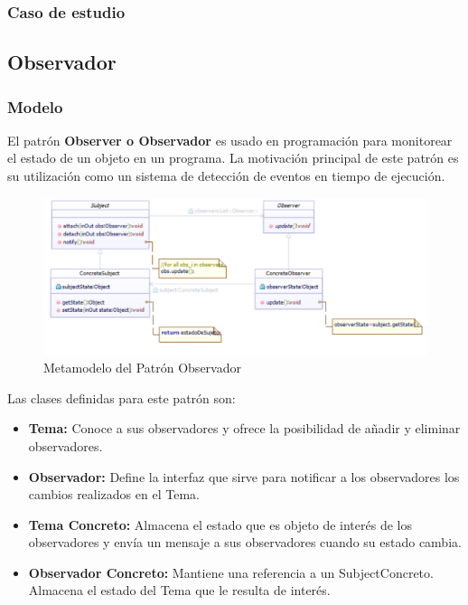 \subsubsection{Caso de estudio}
\newpage

\subsection{Observador}
\subsubsection{Modelo}

El patrón \textbf{Observer o Observador} es usado en programación para monitorear el estado de un objeto en un programa. La motivación principal de este patrón es su utilización como un sistema de detección de eventos en tiempo de ejecución.

\begin{figure}[th!]
	\centering
	\includegraphics[width=0.8\linewidth]{arquitectura/imagenes/modeloObservador}
	\caption{Metamodelo del Patrón Observador}
	\label{fig:metamodelo patron observador}
\end{figure}

Las clases definidas para este patrón son:

\begin{itemize}
	\item \textbf{Tema: }Conoce a sus observadores y ofrece la posibilidad de añadir y eliminar observadores.
	\item \textbf{Observador: }Define la interfaz que sirve para notificar a los observadores los cambios realizados en el Tema.
	\item \textbf{Tema Concreto: }Almacena el estado que es objeto de interés de los observadores y envía un mensaje a sus observadores cuando su estado cambia.
	\item \textbf{Observador Concreto: }Mantiene una referencia a un SubjectConcreto. Almacena el estado del Tema que le resulta de interés.
\end{itemize}



